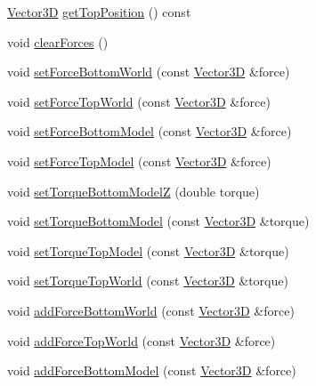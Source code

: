 \begin{DoxyCompactItemize}
\hyperlink{class_vector3_d}{Vector3\-D} \hyperlink{class_lagrange_1_1_lagrangian_racer_ace39268853f7088cc984ea72b78d63c7}{get\-Top\-Position} () const 
\item 
void \hyperlink{class_lagrange_1_1_lagrangian_racer_ad54dda570366844b036db2fea60120c4}{clear\-Forces} ()
\item 
void \hyperlink{class_lagrange_1_1_lagrangian_racer_a972b438060163d865de9e3d52714a995}{set\-Force\-Bottom\-World} (const \hyperlink{class_vector3_d}{Vector3\-D} \&force)
\item 
void \hyperlink{class_lagrange_1_1_lagrangian_racer_a353eb3b9f1cefe5b09bfebf75cf09587}{set\-Force\-Top\-World} (const \hyperlink{class_vector3_d}{Vector3\-D} \&force)
\item 
void \hyperlink{class_lagrange_1_1_lagrangian_racer_abe7a4e8d86ac16426c393abe85f58b6f}{set\-Force\-Bottom\-Model} (const \hyperlink{class_vector3_d}{Vector3\-D} \&force)
\item 
void \hyperlink{class_lagrange_1_1_lagrangian_racer_a9590ef3a0d4ef15af3fffbefc3ff1ecf}{set\-Force\-Top\-Model} (const \hyperlink{class_vector3_d}{Vector3\-D} \&force)
\item 
void \hyperlink{class_lagrange_1_1_lagrangian_racer_ade76dfca80d5084c25efb884d271080e}{set\-Torque\-Bottom\-Model\-Z} (double torque)
\item 
void \hyperlink{class_lagrange_1_1_lagrangian_racer_a5e1e87c22da38dffd72eb2f1c2a3a748}{set\-Torque\-Bottom\-Model} (const \hyperlink{class_vector3_d}{Vector3\-D} \&torque)
\item 
void \hyperlink{class_lagrange_1_1_lagrangian_racer_ae7dd23c80c9708efc7eb57d8ba88bfab}{set\-Torque\-Top\-Model} (const \hyperlink{class_vector3_d}{Vector3\-D} \&torque)
\item 
void \hyperlink{class_lagrange_1_1_lagrangian_racer_a29249707fa1a0be9c433a74e043d4294}{set\-Torque\-Top\-World} (const \hyperlink{class_vector3_d}{Vector3\-D} \&torque)
\item 
void \hyperlink{class_lagrange_1_1_lagrangian_racer_aa9366243d714865b601d81d10f4e6dce}{add\-Force\-Bottom\-World} (const \hyperlink{class_vector3_d}{Vector3\-D} \&force)
\item 
void \hyperlink{class_lagrange_1_1_lagrangian_racer_a853814ef5e85ed91b5d21285f45f3483}{add\-Force\-Top\-World} (const \hyperlink{class_vector3_d}{Vector3\-D} \&force)
\item 
void \hyperlink{class_lagrange_1_1_lagrangian_racer_a7aaf93c05924f525995d837a16d23a28}{add\-Force\-Bottom\-Model} (const \hyperlink{class_vector3_d}{Vector3\-D} \&force)

\end{DoxyCompactItemize}
